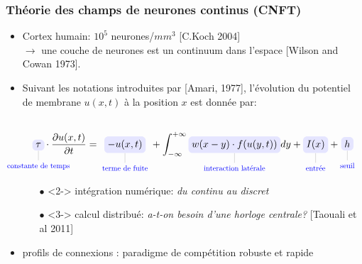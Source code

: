 \documentclass[10pt]{beamer}
\begin{document}
\begin{frame}
  \frametitle{Th\'eorie des champs de neurones continus (CNFT)}

\begin{itemize}
\item Cortex humain: $10^5$ neurones/$mm^3$ [C.Koch 2004]\\
{\color {blue}$\to$} une couche de neurones est {\color{blue}un continuum} dans l'espace [Wilson and Cowan 1973].
\item<1-> Suivant les notations introduites par [Amari, 1977], l'\'evolution du {\color{blue} potentiel de membrane} $u(x,t)$ à la position $x$ est donn\'ee par:
    \vspace{-3mm}
    \begin{small}
      \begin{equation*}
        \tikz[baseline]{
          \path[use as bounding box] (0,0) rectangle (.2,1);
          \node[fill=blue!10,anchor=base,
            rounded corners,pin={[blue,scale=.75]below:constante de temps}]
               {$\tau$};
        }
        \cdot \frac{\partial{u(x,t)}}{\partial{t}} = 
        \tikz[baseline]{
          \node[fill=blue!10,anchor=base,
            rounded corners,pin={[blue,scale=.75]below:terme de fuite}]
               {$-u(x,t)$};
        } + \int_{-\infty}^{+\infty}
        \tikz[baseline]{
          \node[fill=blue!10,anchor=base,
            rounded corners,pin={[blue,scale=.75]below:interaction lat\'erale}] (t1)
               {$w(x-y) \cdot f(u(y,t))$};
        } dy +
        \tikz[baseline]{
          \node[fill=blue!10,anchor=base,
            rounded corners,pin={[blue,scale=.75]below:entr\'ee}]
               {$I(x)$};
        } + 
        \tikz[baseline]{
          \path[use as bounding box] (-.25,0) rectangle (0,1);
          \node[fill=blue!10,anchor=base,
            rounded corners,pin={[blue,scale=.75]below:seuil}]
               {$h$};
        }
      \end{equation*}
    \end{small}
\begin{itemize}
\item[$\bullet$]<2-> int\'egration num\'erique: {\em {\color {myblue}du continu au discret}}
\item[$\bullet$]<3-> calcul distribu\'e: {\em {\color {myblue} a-t-on besoin d'une horloge centrale?}}
[Taouali et al 2011]%
\end{itemize}
\item<4-> profils de connexions : {\color{blue}paradigme de comp\'etition} robuste et rapide
\end{itemize}

\end{frame}
\end{document}

